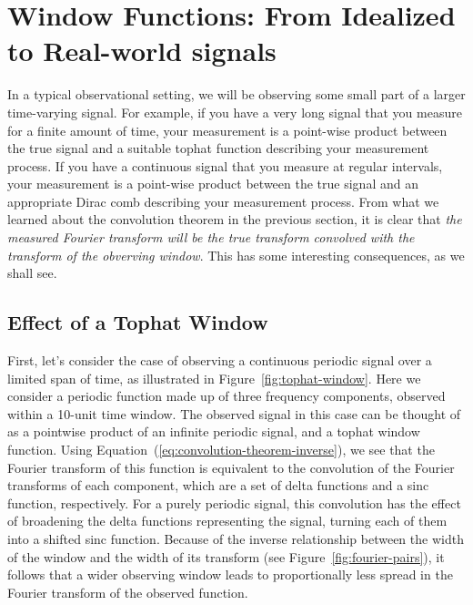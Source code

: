 \documentclass[preprint]{aastex}
\newcommand{\Fig}[1]{Figure~\ref{fig:#1}}
\newcommand{\Eq}[1]{Equation~(\ref{eq:#1})}
\newcommand{\eq}[1]{\Eq{#1}}
\begin{document}
\section{Window Functions: From Idealized to Real-world signals}
In a typical observational setting, we will be observing some small part of
a larger time-varying signal.
For example, if you have a very long signal that you measure for a finite
amount of time, your measurement is a point-wise product between the true
signal and a suitable tophat function describing your measurement process.
If you have a continuous signal that you measure at regular intervals, your
measurement is a point-wise product between the true signal and an appropriate
Dirac comb describing your measurement process.
From what we learned about the convolution theorem in the previous section, it
is clear that {\it the measured Fourier transform will be the true transform
convolved with the transform of the obverving window}.
This has some interesting consequences, as we shall see.

\subsection{Effect of a Tophat Window}
First, let's consider the case of observing a continuous periodic signal over
a limited span of time, as illustrated in \Fig{tophat-window}.
Here we consider a periodic function made up of three frequency components, observed within a 10-unit time window.
The observed signal in this case can be thought of as a pointwise product of an infinite periodic signal, and a tophat window function.
Using \eq{convolution-theorem-inverse}, we see that the Fourier transform of
this function is equivalent to the convolution of the Fourier transforms of each component, which are a set of delta functions and a sinc function, respectively.
For a purely periodic signal, this convolution has the effect of broadening the delta functions representing the signal, turning each of them into a shifted sinc function.
Because of the inverse relationship between the width of the window and the width of its transform (see \Fig{fourier-pairs}), it follows that a wider observing window leads to proportionally less spread in the Fourier transform of the observed function.
\end{document}
